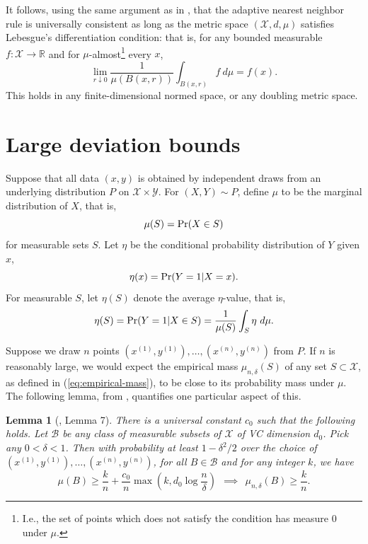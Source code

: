 \documentclass{article}
\def\R{{\mathbb{R}}}
\def\pr{{\rm Pr}}
\def\X{{\mathcal X}}
\def\Y{{\mathcal Y}}
\def\B{{\mathcal B}}
\newtheorem{lemma}[theorem]{Lemma}
\newcommand{\comment}[3]{}  %
\newcommand{\shay}[1]{\comment{purple}{Shay}{#1}}
\begin{document}
It follows, using the same argument as in \cite{ChaudhuriDasgupta2014}, that the adaptive nearest neighbor rule is universally consistent as long as the metric space $(\X, d, \mu)$ satisfies Lebesgue's differentiation condition: that is, for any bounded measurable $f: \X \rightarrow \R$ and for $\mu$-almost\footnote{I.e., the set of points which does not satisfy the condition has measure $0$ under $\mu$.} every $x$,
$$ \lim_{r \downarrow 0} \frac{1}{\mu(B(x,r))} \int_{B(x,r)} f \ d\mu = f(x) .$$
This holds in any finite-dimensional normed space, or any doubling metric space.
\shay{In order for consistency to hold, 
one should tune $\delta= \delta(n)$ such that $\delta(n)\to_{n\to\infty} 0$.
(note that $\delta$ is a parameter of our algorithm, unlike in \cite{ChaudhuriDasgupta2014}, where $\delta$
was just defined for sake of analysis). }
\fi 


\section{Large deviation bounds}

Suppose that all data $(x,y)$ is obtained by independent draws from an underlying distribution $P$ on $\X \times \Y$. For $(X,Y) \sim P$, define $\mu$ to be the marginal distribution of $X$, that is,
$$ \mu(S) = \pr(X \in S) $$
for measurable sets $S$. Let $\eta$ be the conditional probability distribution of $Y$ given $x$,
$$ \eta(x) = \pr(Y = 1| X = x) .$$
For measurable $S$, let $\eta(S)$ denote the average $\eta$-value, that is,
$$ \eta(S) = \pr(Y = 1| X \in S) = \frac{1}{\mu(S)} \int_S \eta \ d \mu .$$

Suppose we draw $n$ points $(x^{(1)}, y^{(1)}), \ldots, (x^{(n)}, y^{(n)})$ from $P$. If $n$ is reasonably large, we would expect the empirical mass $\mu_{n,\delta}(S)$ of any set $S \subset \X$, as defined in (\ref{eq:empirical-mass}), to be close to its probability mass under $\mu$. The following lemma, from \cite{ChaudhuriDasgupta2010}, quantifies one particular aspect of this.
\begin{lemma}[\cite{ChaudhuriDasgupta2010}, Lemma 7]
There is a universal constant $c_0$ such that the following holds. Let $\B$ be any class of measurable subsets of $\X$ of VC dimension $d_0$. Pick any $0 < \delta < 1$. Then with probability at least $1-\delta^2/2$ over the choice of $(x^{(1)}, y^{(1)}), \ldots, (x^{(n)}, y^{(n)})$, for all $B \in \B$ and for any integer $k$, we have
$$ \mu(B) \geq \frac{k}{n} + \frac{c_0}{n} \max \left( k, d_0 \log \frac{n}{\delta} \right)
\ \ \implies \ \ 
\mu_{n,\delta}(B) \geq \frac{k}{n} .$$
\label{lemma:points-in-balls}
\end{lemma}
\end{document}
